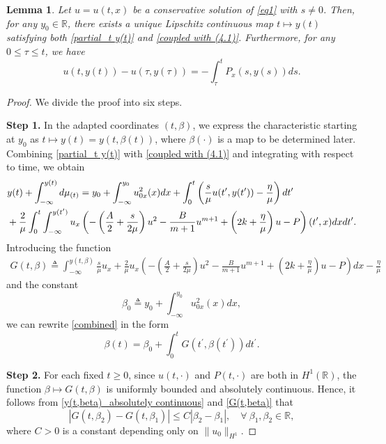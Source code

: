 \documentclass[10pt]{article}
\newtheorem{lemm}[theo]{Lemma}
\numberwithin{equation}{section}
\begin{document}
	\begin{lemm}
		Let $u=u(t,x)$ be a conservative solution of \eqref{eq1} with $s\neq0$. Then, for any $y_0\in\mathbb{R}$, there exists a unique Lipschitz continuous map $t\mapsto y(t)$ satisfying both \eqref{partial_t y(t)} and \eqref{coupled with (4.1)}. Furthermore, for any $0\leq\tau\leq t$, we have
		\begin{equation}\label{u_Px}
			u(t,y(t))-u(\tau,y(\tau))=-\int_\tau^t P_x(s,y(s))ds.
		\end{equation}
	\end{lemm}
	\begin{proof}
		We divide the proof into six steps.
		
		\textbf{Step 1.} In the adapted coordinates $(t,\beta)$, we express the characteristic starting at $y_0$ as $t \mapsto y(t) = y(t, \beta(t))$, where $\beta(\cdot)$ is a map to be determined later. Combining \eqref{partial_t y(t)} with \eqref{coupled with (4.1)} and
		integrating with respect to time, we obtain
		\begin{align}
			&y(t)+\int_{-\infty}^{y(t)}d\mu_{(t)}=y_0+\int_{-\infty}^{y_0}u_{0x}^2(x)dx+\int_{0}^{t}\left(\frac{s}{\mu}u(t^\prime,y(t^\prime))-\frac{\eta}{\mu}\right)dt^\prime\notag\\
			&+\frac{2}{\mu}\int_{0}^{t}\int_{-\infty}^{y(t^\prime)}u_x\left(-\left(\frac{A}{2}+\frac{s}{2\mu}\right)u^2-\frac{B}{m+1}u^{m+1}+\left(2k+\frac{\eta}{\mu}\right)u-P\right)(t^\prime,x)dxdt^\prime.\label{combined}
		\end{align}
		Introducing the function
		\begin{align}\label{G(t,beta)}
			G(t,\beta)\triangleq\int_{-\infty}^{y(t,\beta)}\frac{s}{\mu}u_x+\frac{2}{\mu}u_x\left(-\left(\frac{A}{2}+\frac{s}{2\mu}\right)u^2-\frac{B}{m+1}u^{m+1}+\left(2k+\frac{\eta}{\mu}\right)u-P\right)dx-\frac{\eta}{\mu}
		\end{align}
		and the constant
		\begin{equation}\label{beta_0}
			\beta_0\triangleq y_0+\int_{-\infty}^{y_0}u_{0x}^2(x)dx,
		\end{equation}
		we can rewrite \eqref{combined} in the form
		\begin{equation}\label{beta(t)}
			\beta(t)=\beta_0+\int_0^tG(t^\prime,\beta(t^\prime))dt^\prime.
		\end{equation}
		
		\textbf{Step 2.} For each fixed $t\geq 0$, since $u(t,\cdot)$ and $P(t,\cdot)$ are both in $H^1(\mathbb{R})$, the function $\beta\mapsto G(t,\beta)$ is uniformly bounded and absolutely continuous. Hence, it follows from \eqref{y(t,beta)_absolutely continuous} and \eqref{G(t,beta)} that
		\begin{equation}\label{G(t,beta)_lip}
			|G(t,\beta_{2})-G(t,\beta_{1})|\leq C|\beta_{2}-\beta_{1}|,\quad \forall\ \beta_{1},\beta_{2}\in\mathbb{R},
		\end{equation}
		where $C>0$ is a constant depending only on $\|u_0\|_{H^1}$.
		

\end{proof}
\end{document}
